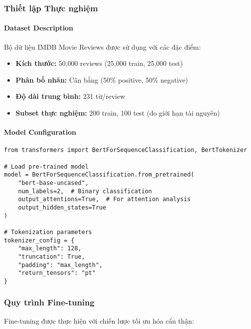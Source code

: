 \subsubsection{Thiết lập Thực nghiệm}

\paragraph{Dataset Description}
Bộ dữ liệu IMDB Movie Reviews được sử dụng với các đặc điểm:
\begin{itemize}
    \item \textbf{Kích thước:} 50,000 reviews (25,000 train, 25,000 test)
    \item \textbf{Phân bố nhãn:} Cân bằng (50\% positive, 50\% negative)  
    \item \textbf{Độ dài trung bình:} 231 từ/review
    \item \textbf{Subset thực nghiệm:} 200 train, 100 test (do giới hạn tài nguyên)
\end{itemize}

\paragraph{Model Configuration}
\begin{verbatim}
from transformers import BertForSequenceClassification, BertTokenizer

# Load pre-trained model
model = BertForSequenceClassification.from_pretrained(
    "bert-base-uncased",
    num_labels=2,  # Binary classification
    output_attentions=True,  # For attention analysis
    output_hidden_states=True
)

# Tokenization parameters
tokenizer_config = {
    "max_length": 128,
    "truncation": True,
    "padding": "max_length",
    "return_tensors": "pt"
}
\end{verbatim}

\subsubsection{Quy trình Fine-tuning}

Fine-tuning được thực hiện với chiến lược tối ưu hóa cẩn thận:

